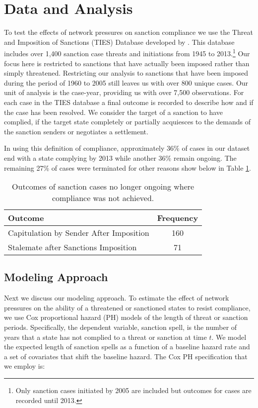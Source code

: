 \section*{Data and Analysis}
\label{empirics}

To test the effects of network pressures on sanction compliance we use the Threat and Imposition of Sanctions (TIES) Database developed by \citet{morgan2009threat}. This database includes over 1,400 sanction case threats and initiations from 1945 to 2013.\footnote{Only sanction cases initiated by 2005 are included but outcomes for cases are recorded until 2013.} Our focus here is restricted to sanctions that have actually been imposed rather than simply threatened. Restricting our analysis to sanctions that have been imposed during the period of 1960 to 2005 still leaves us with over 800 unique cases. Our unit of analysis is the case-year, providing us with over 7,500 observations. For each case in the TIES database a final outcome is recorded to describe how and if the case has been resolved. We consider the target of a sanction to have complied, if the target state completely or partially acquiesces to the demands of the sanction senders or negotiates a settlement.
	
In using this definition of compliance, approximately 36\% of cases in our dataset end with a state complying by 2013 while another 36\% remain ongoing. The remaining 27\% of cases were terminated for other reasons show below in Table \ref{tab:termCases}.

\begin{table}[ht]
	\centering
	\begin{tabular}{lc}
		\hline\hline
		Outcome & Frequency \\
		\hline
		Capitulation by Sender After Imposition & 160 \\
		Stalemate after Sanctions Imposition & 71 \\
		\hline\hline
	\end{tabular}
	\caption{Outcomes of sanction cases no longer ongoing where compliance was not achieved.}
	\label{tab:termCases}	
\end{table}

\subsection*{Modeling Approach} 

Next we discuss our modeling approach. To estimate the effect of network pressures on the ability of a threatened or sanctioned states to resist compliance, we use Cox proportional hazard (PH) models of the length of threat or sanction periods. Specifically, the dependent variable, sanction spell, is the number of years that a state has not complied to a threat or sanction at time $t$. We model the expected length of sanction spells as a function of a baseline hazard rate and a set of covariates that shift the baseline hazard. The Cox PH specification that we employ is:

